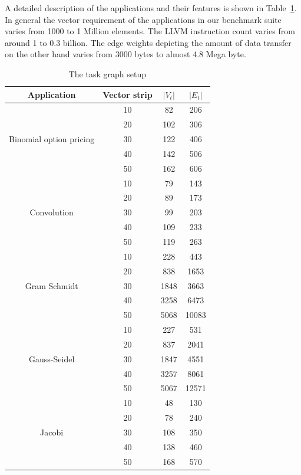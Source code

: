 A detailed description of the applications and their features is shown
in Table~\ref{tab:1}. In general the vector requirement of the
applications in our benchmark suite varies from 1000 to 1 Million
elements. The LLVM instruction count varies from around 1 to 0.3
billion. The edge weights depicting the amount of data transfer on the
other hand varies from 3000 bytes to almost 4.8 Mega byte.

\begin{table}[h!]
  \centering
  \begin{tabular}{|c|c|c|c|}
    \hline
    \textbf{Application} & \textbf{Vector strip} & $|V_t|$ & $|E_t|$ \\
    \hline
    \multirow{5}{*}{Binomial option pricing} & 10 & 82 & 206 \\
    & 20 & 102 & 306 \\
    & 30 & 122 & 406 \\
    & 40 & 142 & 506 \\
    & 50 & 162 & 606 \\
    \hline
    \multirow{5}{*}{Convolution} & 10 & 79 & 143 \\
    & 20 & 89 & 173 \\
    & 30 & 99 & 203 \\
    & 40 & 109 & 233 \\
    & 50 & 119 & 263 \\
    \hline
    \multirow{5}{*}{Gram Schmidt} & 10 & 228 & 443 \\
    & 20 & 838 & 1653 \\
    & 30 & 1848 & 3663 \\
    & 40 & 3258 & 6473 \\
    & 50 & 5068 & 10083\\
    \hline
    \multirow{5}{*}{Gauss-Seidel} & 10 & 227 & 531 \\
    & 20 & 837 & 2041 \\
    & 30 & 1847 & 4551 \\
    & 40 & 3257 & 8061 \\
    & 50 & 5067 & 12571\\
    \hline
    \multirow{5}{*}{Jacobi} & 10 & 48 & 130 \\
    & 20 & 78 & 240 \\
    & 30 & 108 & 350 \\
    & 40 & 138 & 460 \\
    & 50 & 168 & 570\\
    \hline
  \end{tabular}
  \caption{The task graph setup}
  \label{tab:1}
\end{table}

